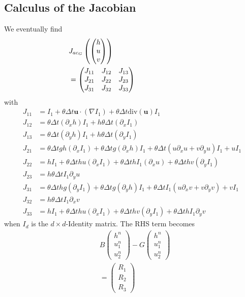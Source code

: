 \documentclass[a4paper, 11pt]{article}
\begin{document}
\subsection{Calculus of the Jacobian}
We eventually find
\begin{equation*}
\begin{split}
&\hspace*{-3cm}J_{ac_G}\left(\begin{pmatrix}h\\u\\v\end{pmatrix}\right)\\&\hspace*{-3cm}=
\begin{pmatrix}
J_{11} & J_{12} & J_{13} \\
J_{21}& J_{22}& J_{23}\\
J_{31}& J_{32}& J_{33}
\end{pmatrix}
\end{split}
\end{equation*}
with 
\begin{align*}
J_{11} &= I_1+\theta\Delta t\boldsymbol{u}\cdot\left(\nabla I_1\right)+\theta\Delta t\text{div}\left(\boldsymbol{u}\right)I_1 \\
J_{12} & =\theta\Delta t(\partial_xh)I_1+h\theta\Delta t(\partial_xI_1) \\
J_{13} & =\theta\Delta t(\partial_yh)I_1+h\theta\Delta t(\partial_yI_1)\\
J_{21} &= \theta\Delta tgh(\partial_xI_1)+\theta\Delta tg\left(\partial_xh\right)I_1+\theta\Delta t\left(u\partial_xu+v\partial_yu\right)I_1+uI_1 \\
J_{22} &= hI_1+\theta\Delta thu(\partial_xI_1)+\theta\Delta thI_1(\partial_xu)+\theta\Delta thv(\partial_yI_1)\\
J_{23} &= h\theta\Delta tI_1\partial_y u\\
J_{31} &= \theta\Delta thg(\partial_yI_1)+\theta\Delta tg\left(\partial_yh\right)I_1+\theta\Delta tI_1(u\partial_xv+v\partial_yv)+vI_1\\
J_{32} &= h\theta\Delta tI_1\partial_x v \\
J_{33} &= hI_1+\theta\Delta thu(\partial_xI_1)+\theta\Delta thv(\partial_yI_1)+\theta\Delta thI_1\partial_yv
\end{align*}
when $I_d$ is the $d\times d$-Identity matrix.
The RHS term becomes
\begin{equation*}
\begin{split}
&B\begin{pmatrix}h^n\\u_1^n\\u_2^n\end{pmatrix}-G\begin{pmatrix}h^{n}\\u_1^{n}\\u_2^{n}\end{pmatrix}\\
&=\begin{pmatrix} R_{1}\\
 R_{2}\\
 R_{3}\end{pmatrix}
\end{split}
\end{equation*}
\end{document}

